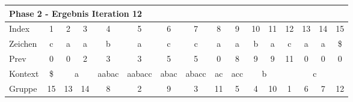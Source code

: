 \begin{table}[H]
\caption[Konstruktion des Suffix Arrays f{\"u}r das Wort caabaccaabacaa: Phase 2, Iteration 11]{Konstruktion des Suffix Arrays f{\"u}r das Wort caabaccaabacaa: Phase 2, Iteration 11. Betrachteter Index: 11, enthaltener Wert: 4, Vorg{\"a}ngerelement: 3, \prevpointer-Kette: 2. Keine neuen Elemente werden in SA aufgenommen.}
\label{table_complex_example_2_11} 
\end{table}

\begin{table}[H]
\centering
\begin{adjustbox}{max width=\textwidth}
\centering
\begin{tabular}{lccccccccccccccc}
\multicolumn{16}{l}{Phase 2 - Ergebnis Iteration 12}                                                                                                                                                                                                                                                                                      \\ \hline
\multicolumn{1}{l|}{Index}   & 1                       & 2  & 3                       & 4                          & 5                           & 6                         & 7                          & 8                       & 9                        & 10 & 11                      & 12                         & 13 & 14 & 15 \\
\multicolumn{1}{l|}{Zeichen} & c                       & a  & a                       & b                          & a                           & c                         & c                          & a                       & a                        & b  & a                       & c                          & a  & a  & \$ \\
\multicolumn{1}{l|}{Prev}    & 0                       & 0  & 2                       & 3                          & 3                           & 5                         & 5                          & 0                       & 8                        & 9  & 9                       & 11                         & 0  & 0  & 0  \\ \hline
\multicolumn{1}{l|}{Kontext} & \multicolumn{1}{c|}{\$} & \multicolumn{2}{c|}{a}       & \multicolumn{1}{c|}{aabac} & \multicolumn{1}{c|}{aabacc} & \multicolumn{1}{c|}{abac} & \multicolumn{1}{c|}{abacc} & \multicolumn{1}{c|}{ac} & \multicolumn{1}{c|}{acc} & \multicolumn{2}{c|}{b}       & \multicolumn{4}{c}{c}                     \\
\multicolumn{1}{l|}{Gruppe}  & \multicolumn{1}{c|}{15} & 13 & \multicolumn{1}{c|}{14} & \multicolumn{1}{c|}{8}     & \multicolumn{1}{c|}{2}      & \multicolumn{1}{c|}{9}    & \multicolumn{1}{c|}{3}     & \multicolumn{1}{c|}{11} & \multicolumn{1}{c|}{5}   & 4  & \multicolumn{1}{c|}{10} & 1                          & 6  & 7  & 12 \\

\end{tabular}
\end{adjustbox}
\end{table}
